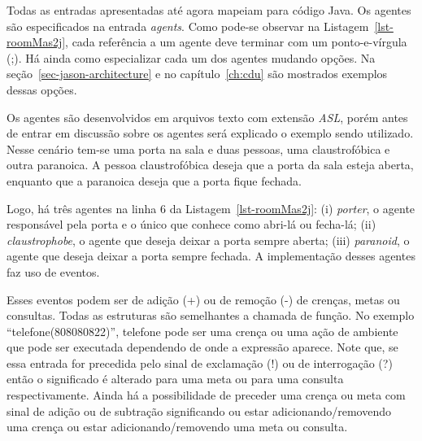 Todas as entradas apresentadas até agora mapeiam para código Java.
Os agentes são especificados na entrada \emph{agents}. Como pode-se
observar na Listagem~\ref{lst-roomMas2j}, cada referência a um agente deve
terminar com um ponto-e-vírgula (;). Há ainda como especializar cada um dos
agentes mudando opções. Na seção~\ref{sec-jason-architecture} e no
capítulo~\ref{ch:cdu} são mostrados exemplos dessas opções.

Os agentes são desenvolvidos em arquivos texto com extensão \emph{ASL}, porém
antes de entrar em discussão sobre os agentes será explicado o exemplo sendo
utilizado. Nesse cenário tem-se uma porta na sala e duas pessoas, uma
claustrofóbica e outra paranoica. A pessoa claustrofóbica deseja que a
porta da sala esteja aberta, enquanto que a paranoica deseja que a porta
fique fechada.

Logo, há três agentes na linha 6 da Listagem~\ref{lst-roomMas2j}:
(i) \emph{porter}, o agente responsável pela porta e o único que conhece
como abri-lá ou fecha-lá;
(ii) \emph{claustrophobe}, o agente que deseja deixar a porta sempre aberta;
(iii) \emph{paranoid}, o agente que deseja deixar a porta sempre fechada.
A implementação desses agentes faz uso de eventos.

Esses eventos podem ser de adição (+) ou de remoção (-) de crenças, metas ou
consultas. Todas as estruturas são semelhantes a chamada de função. No
exemplo ``telefone(808080822)'', telefone pode ser uma crença ou uma ação de
ambiente que pode ser executada dependendo de onde a expressão aparece.
Note que, se essa entrada for precedida pelo sinal de exclamação (!) ou de
interrogação (?) então o significado é alterado para uma meta ou para uma
consulta respectivamente. Ainda há a possibilidade de preceder uma crença ou
meta com sinal de adição ou de subtração significando ou estar
adicionando/removendo uma crença ou estar adicionando/removendo uma meta ou
consulta.

